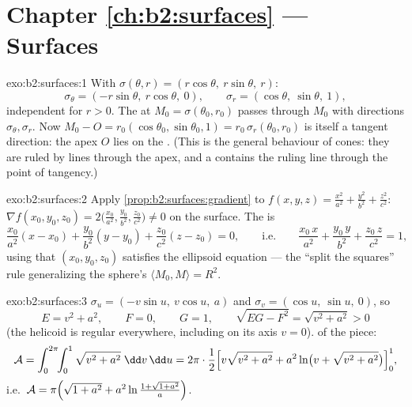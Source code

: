 \section*{Chapter \ref{ch:b2:surfaces} --- Surfaces}

\begin{solution}{exo:b2:surfaces:1}
With $\sigma(\theta, r) = (r\cos\theta,\ r\sin\theta,\ r)$:
\[
\sigma_\theta = (-r\sin\theta,\ r\cos\theta,\ 0),
\qquad
\sigma_r = (\cos\theta,\ \sin\theta,\ 1),
\]
independent for $r > 0$. The  at $M_0 =
\sigma(\theta_0, r_0)$ passes through $M_0$ with directions
$\sigma_\theta, \sigma_r$. Now $M_0 - O = r_0(\cos\theta_0,
\sin\theta_0, 1) = r_0\,\sigma_r(\theta_0, r_0)$ is itself a
tangent direction: the apex $O$ lies on the . (This
is the general behaviour of cones: they are ruled by lines through
the apex, and a  contains the ruling line through the
point of tangency.)
\end{solution}

\begin{solution}{exo:b2:surfaces:2}
Apply \cref{prop:b2:surfaces:gradient} to $f(x,y,z) =
\frac{x^2}{a^2} + \frac{y^2}{b^2} + \frac{z^2}{c^2}$: $\nabla
f(x_0,y_0,z_0) = 2\bigl(\frac{x_0}{a^2}, \frac{y_0}{b^2},
\frac{z_0}{c^2}\bigr) \neq 0$ on the surface. The  is
\[
\frac{x_0}{a^2}(x - x_0) + \frac{y_0}{b^2}(y - y_0)
+ \frac{z_0}{c^2}(z - z_0) = 0,
\qquad\text{i.e.}\qquad
\frac{x_0\,x}{a^2} + \frac{y_0\,y}{b^2} + \frac{z_0\,z}{c^2} = 1,
\]
using that $(x_0, y_0, z_0)$ satisfies the ellipsoid equation ---
the ``split the squares'' rule generalizing the sphere's $\langle
M_0, M \rangle = R^2$.
\end{solution}

\begin{solution}{exo:b2:surfaces:3}
$\sigma_u = (-v\sin u,\ v\cos u,\ a)$ and $\sigma_v = (\cos u,\
\sin u,\ 0)$, so
\[
E = v^2 + a^2, \qquad F = 0, \qquad G = 1,
\qquad
\sqrt{EG - F^2} = \sqrt{v^2 + a^2} > 0
\]
(the helicoid is regular everywhere, including on its axis $v =
0$).  of the piece:
\[
\mathcal{A} = \int_0^{2\pi}\!\!\int_0^1
\sqrt{v^2 + a^2}\;\dd v\,\dd u
= 2\pi\cdot\frac12\Bigl[v\sqrt{v^2 + a^2}
+ a^2\ln\bigl(v + \sqrt{v^2 + a^2}\bigr)\Bigr]_0^1 ,
\]
i.e.\ $\mathcal{A} = \pi\Bigl(\sqrt{1 + a^2} +
a^2\ln\frac{1 + \sqrt{1 + a^2}}{a}\Bigr)$.
\end{solution}

